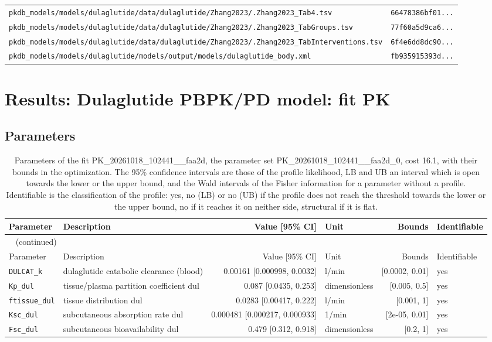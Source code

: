 \begin{longtable}{ll}
\texttt{pkdb\_models/models/dulaglutide/data/dulaglutide/Zhang2023/.Zhang2023\_Tab4.tsv} & \texttt{66478386bf01...} \\
\texttt{pkdb\_models/models/dulaglutide/data/dulaglutide/Zhang2023/.Zhang2023\_TabGroups.tsv} & \texttt{77f60a5d9ca6...} \\
\texttt{pkdb\_models/models/dulaglutide/data/dulaglutide/Zhang2023/.Zhang2023\_TabInterventions.tsv} & \texttt{6f4e6dd8dc90...} \\
\texttt{pkdb\_models/models/dulaglutide/models/output/models/dulaglutide\_body.xml} & \texttt{fb935915393d...} \\
\end{longtable}

\section{Results: Dulaglutide PBPK/PD model: fit PK}

\subsection{Parameters}

\begin{longtable}{llrlrl}
\caption{Parameters of the fit PK\_20261018\_102441\_\_faa2d, the parameter set PK\_20261018\_102441\_\_faa2d\_0, cost 16.1, with their bounds in the optimization. The 95\% confidence intervals are those of the profile likelihood, LB and UB an interval which is open towards the lower or the upper bound, and the Wald intervals of the Fisher information for a parameter without a profile. Identifiable is the classification of the profile: yes, no (LB) or no (UB) if the profile does not reach the threshold towards the lower or the upper bound, no if it reaches it on neither side, structural if it is flat.}\label{tab:parameters:PK_20261018_102441__faa2d} \\
\toprule
Parameter & Description & Value [95\% CI] & Unit & Bounds & Identifiable \\
\midrule
\endfirsthead
\multicolumn{6}{l}{\small\tablename~\thetable{} (continued)} \\
\toprule
Parameter & Description & Value [95\% CI] & Unit & Bounds & Identifiable \\
\midrule
\endhead
\bottomrule
\endlastfoot
\texttt{DULCAT\_k} & dulaglutide catabolic clearance (blood) & 0.00161 [0.000998, 0.0032] & l/min & [0.0002, 0.01] & yes \\
\texttt{Kp\_dul} & tissue/plasma partition coefficient dul & 0.087 [0.0435, 0.253] & dimensionless & [0.005, 0.5] & yes \\
\texttt{ftissue\_dul} & tissue distribution dul & 0.0283 [0.00417, 0.222] & l/min & [0.001, 1] & yes \\
\texttt{Ksc\_dul} & subcutaneous absorption rate dul & 0.000481 [0.000217, 0.000933] & 1/min & [2e-05, 0.01] & yes \\
\texttt{Fsc\_dul} & subcutaneous bioavailability dul & 0.479 [0.312, 0.918] & dimensionless & [0.2, 1] & yes \\
\end{longtable}


